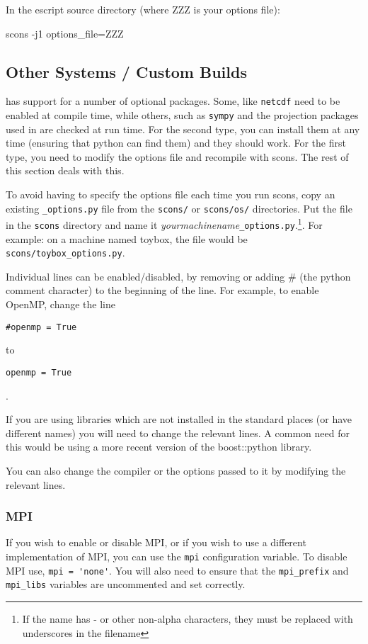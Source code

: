 In the escript source directory (where ZZZ is your options file):
\begin{shellCode}
scons -j1 options_file=ZZZ
\end{shellCode}



\subsection{Other Systems / Custom Builds}\label{sec:othersrc}

\escript has support for a number of optional packages.
Some, like \texttt{netcdf} need to be enabled at compile time, while others, such as \texttt{sympy} and the projection packages
used in \downunder are checked at run time.
For the second type, you can install them at any time (ensuring that python can find them) and they should work.
For the first type, you need to modify the options file and recompile with scons.
The rest of this section deals with this.

To avoid having to specify the options file each time you run scons, copy an existing \texttt{_options.py} file from the 
\texttt{scons/} or \texttt{scons/os/} directories. Put the file in the \texttt{scons} directory and name 
it \textit{yourmachinename}\texttt{_options.py}.\footnote{If the name 
has - or other non-alpha characters, they must be replaced with underscores in the filename}.
For example: on a machine named toybox, the file would be \texttt{scons/toybox_options.py}.

Individual lines can be enabled/disabled, by removing or adding \# (the python comment character) to the beginning of the line.
For example, to enable OpenMP, change the line
\begin{verbatim}
#openmp = True 
\end{verbatim}
to
\begin{verbatim}
openmp = True 
\end{verbatim}.

If you are using libraries which are not installed in the standard places (or have different names) you will need to 
change the relevant lines.
A common need for this would be using a more recent version of the boost::python library.

You can also change the compiler or the options passed to it by modifying the relevant lines.

\subsubsection*{MPI}
If you wish to enable or disable MPI, or if you wish to use a different implementation of MPI, you can use the \texttt{mpi}
configuration variable.
To disable MPI use, \verb|mpi = 'none'|.
You will also need to ensure that the \texttt{mpi_prefix} and \texttt{mpi_libs} variables are uncommented and set correctly.


